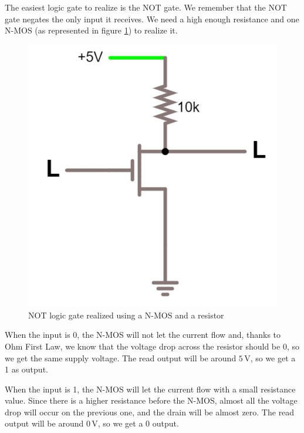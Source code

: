 \documentclass{article}
\begin{document}
The easiest logic gate to realize is the NOT gate. We remember that the NOT gate negates the only input it receives. We need a high enough resistance and one N-MOS (as represented in figure \ref{NOT_N-MOS}) to realize it.
\clearpage
\begin{figure}[h]
    \centering
    \includegraphics[scale=0.3]{IM_NOT_NMOS.JPG}
    \caption{NOT logic gate realized using a N-MOS and a resistor}
    \label{NOT_N-MOS}
\end{figure}

When the input is 0, the N-MOS will not let the current flow and, thanks to Ohm First Law, we know that the voltage drop across the resistor should be 0, so we get the same supply voltage. The read output will be around $5\,\textrm{V}$, so we get a 1 as output.

\vspace{3mm}

When the input is 1, the N-MOS will let the current flow with a small resistance value. Since there is a higher resistance before the N-MOS, almost all the voltage drop will occur on the previous one, and the drain will be almost zero. The read output will be around $0\,\textrm{V}$, so we get a 0 output.

\vspace{3mm}
\end{document}
